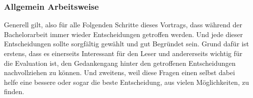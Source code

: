 \subsubsection{Allgemein Arbeitsweise} \myTodo
Generell gilt, also für alle Folgenden Schritte dieses Vortrags, dass während der Bachelorarbeit immer wieder Entscheidungen getroffen werden. Und jede dieser Entscheidungen sollte sorgfältig gewählt und gut Begründet sein. \newline
Grund dafür ist erstens, dass es einerseits Interessant für den Leser und andererseits wichtig für die Evaluation ist, den Gedankengang hinter den getroffenen Entscheidungen nachvollziehen zu können. \newline
Und zweitens, weil diese Fragen einen selbst dabei helfe eine bessere oder sogar die beste Entscheidung, aus vielen Möglichkeiten, zu finden.